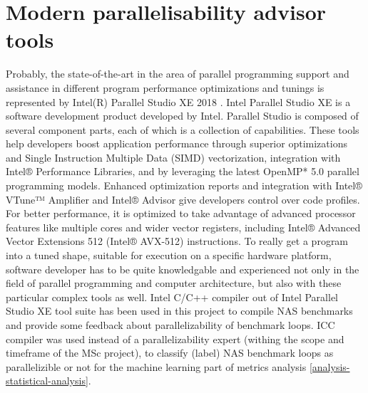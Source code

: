 \section{Modern parallelisability advisor tools}
\label{background-modern-parallelisability-advisor-tools}
\qquad Probably, the state-of-the-art in the area of parallel programming support and assistance in different program performance optimizations and tunings is represented by Intel(R) Parallel Studio XE 2018 \cite{intel-parallel-studio}.\newline
\null\qquad Intel Parallel Studio XE is a software development product developed by Intel. Parallel Studio is composed of several component parts, each of which is a collection of capabilities. These tools help developers boost application performance through superior optimizations and Single Instruction Multiple Data (SIMD) vectorization, integration with Intel® Performance Libraries, and by leveraging the latest OpenMP* 5.0 parallel programming models. Enhanced optimization reports and integration with Intel® VTune™ Amplifier and Intel® Advisor give developers control over code profiles. For better performance, it is optimized to take advantage of advanced processor features like multiple cores and wider vector registers, including Intel® Advanced Vector Extensions 512 (Intel® AVX-512) instructions.\newline
\null\qquad To really get a program into a tuned shape, suitable for execution on a specific hardware platform, software developer has to be quite knowledgable and experienced not only in the field of parallel programming and computer architecture, but also with these particular complex tools as well.\newline
\null\qquad Intel C/C++ compiler \cite{intel-multithreading-guide} out of Intel Parallel Studio XE tool suite has been used in this project to compile NAS benchmarks and provide some feedback about parallelizability of benchmark loops. ICC compiler was used instead of a parallelizability expert (withing the scope and timeframe of the MSc project), to classify (label) NAS benchmark loops as parallelizible or not for the machine learning part of metrics analysis \ref{analysis-statistical-analysis}.  

